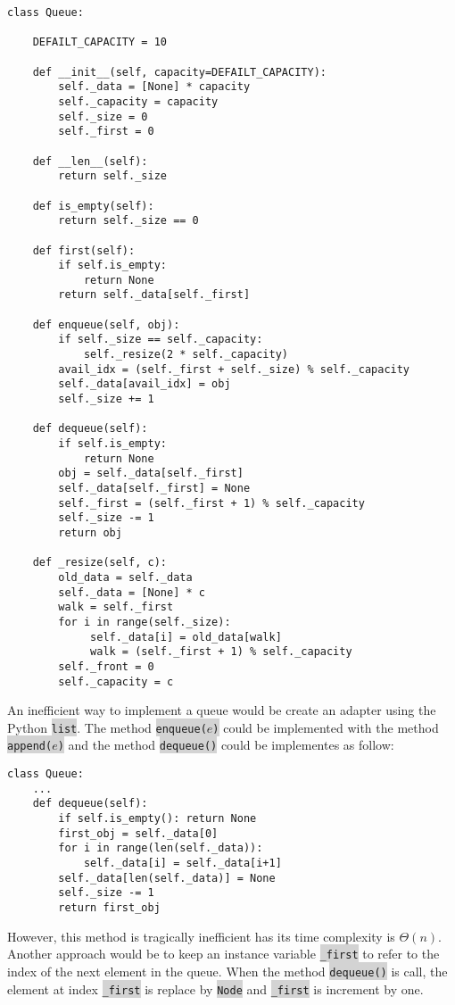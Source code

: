\documentclass[10pt]{article}
\newcommand{\code}[1]{{\small\colorbox{LightGray}{\texttt{#1}}}}
\begin{document}
\begin{verbatim}
class Queue:
    
    DEFAILT_CAPACITY = 10
    
    def __init__(self, capacity=DEFAILT_CAPACITY):
        self._data = [None] * capacity
        self._capacity = capacity
        self._size = 0
        self._first = 0

    def __len__(self):
        return self._size

    def is_empty(self):
        return self._size == 0
    
    def first(self):
        if self.is_empty:
            return None
        return self._data[self._first]
        
    def enqueue(self, obj):
        if self._size == self._capacity:
            self._resize(2 * self._capacity)
        avail_idx = (self._first + self._size) % self._capacity
        self._data[avail_idx] = obj
        self._size += 1
        
    def dequeue(self):
        if self.is_empty:
            return None
        obj = self._data[self._first]
        self._data[self._first] = None
        self._first = (self._first + 1) % self._capacity
        self._size -= 1
    	return obj

    def _resize(self, c):
        old_data = self._data
        self._data = [None] * c
        walk = self._first
        for i in range(self._size):
             self._data[i] = old_data[walk]
             walk = (self._first + 1) % self._capacity
        self._front = 0
        self._capacity = c
\end{verbatim}
An inefficient way to implement a queue would be create an adapter using the Python \code{list}. The method \code{enqueue($e$)} could be implemented with the method \code{append($e$)} and the method \code{dequeue()} could be implementes as follow:
\begin{verbatim}
class Queue:
    ...
    def dequeue(self):
        if self.is_empty(): return None
        first_obj = self._data[0]
        for i in range(len(self._data)):
            self._data[i] = self._data[i+1]
        self._data[len(self._data)] = None
        self._size -= 1
        return first_obj
\end{verbatim}

However, this method is tragically inefficient has its time complexity is $\Theta(n)$. Another approach would be to keep an instance variable \code{\_first} to refer to the index of the next element in the queue. When the method \code{dequeue()} is call, the element at index \code{\_first} is replace by \code{Node} and \code{\_first} is increment by one.
\end{document}
